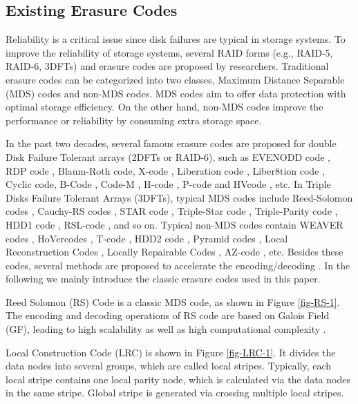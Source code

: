 \documentclass[sigconf]{acmart}
\begin{document}
\subsection{Existing Erasure Codes}\label{existEC}
Reliability is a critical issue since disk failures are typical in storage systems. To improve the reliability of storage systems, several RAID forms (e.g., RAID-5, RAID-6, 3DFTs) and erasure codes are proposed by researchers.  Traditional erasure codes can be categorized into two classes, Maximum Distance Separable (MDS) codes and non-MDS codes. MDS codes aim to offer data protection with optimal storage efficiency. On the other hand, non-MDS codes improve the performance or reliability by consuming extra storage space.

In the past two decades, several famous erasure codes are proposed for double Disk Failure Tolerant arrays (2DFTs or RAID-6), such as EVENODD code \cite{EVENODD}, RDP code \cite{RDP}, Blaum-Roth code\cite{BlaumRoth}, X-code \cite{XCode}, Liberation code \cite{Liberation}, Liber8tion code \cite{Liber8tion}, Cyclic \cite {Cyclic} code, B-Code \cite{BCode}, Code-M \cite{Code-M}, H-code \cite{hcode}, P-code \cite{PCode} and HVcode \cite{HVCode}, etc. 
In Triple Disks Failure Tolerant Arrays (3DFTs), typical MDS codes include Reed-Solomon codes \cite{RS}, Cauchy-RS codes \cite{CRS}, STAR code \cite{STAR}, Triple-Star code \cite{TripleStar}, Triple-Parity code \cite{TPtech}, HDD1 code \cite{HDD}, RSL-code \cite{RSL}, and so on. Typical non-MDS codes contain WEAVER codes \cite{WEAVER}, HoVercodes \cite{HoVer}, T-code \cite{TCode}, HDD2 code \cite{HDD}, Pyramid codes \cite{Pyramid}, Local Reconstruction Codes \cite{LRC}, Locally Repairable Codes \cite{XORing}, AZ-code \cite{AZ-code}, etc. Besides these codes, several methods are proposed to accelerate the encoding/decoding \cite{PCM}\cite{APCM}.
In the following we mainly introduce the classic erasure codes used in this paper.

Reed Solomon (RS) Code \cite{RS} is a classic MDS code, as shown in Figure \ref{fig-RS-1}. The encoding and decoding operations of RS code are based on Galois Field (GF), leading to high scalability as well as high computational complexity \cite{Optimizing2019}.

Local Construction Code (LRC) \cite{LRC} 
is shown in Figure \ref{fig-LRC-1}. It divides the data nodes into several groups, which are called local stripes. Typically, each local stripe contains one local parity node, which is calculated via the data nodes in the same stripe. Global stripe is generated via crossing multiple local stripes.
\end{document}
